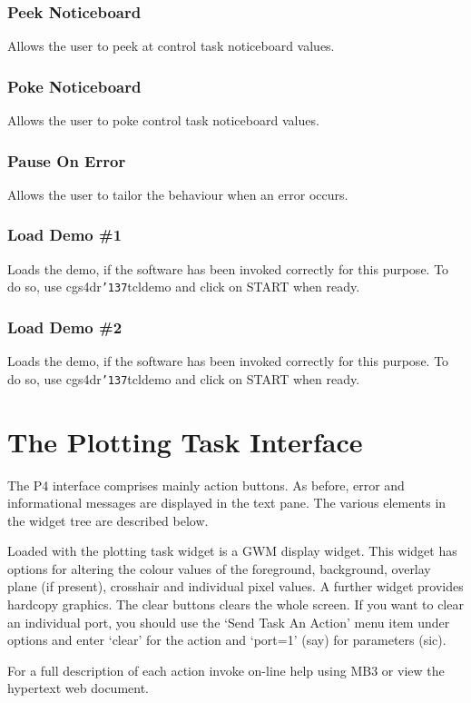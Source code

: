 \documentclass[a4paper]{book}
\renewcommand{\_}{{\tt\char'137}}
\begin{document}
\subsubsection{Peek Noticeboard}
Allows the user to peek at control task noticeboard values.

\subsubsection{Poke Noticeboard}
Allows the user to poke control task noticeboard values.

\subsubsection{Pause On Error}
Allows the user to tailor the behaviour when an error occurs.

\subsubsection{Load Demo \#1}
Loads the demo, if the software has been invoked correctly for this purpose.
To do so, use cgs4dr\_tcldemo and click on START when ready.

\subsubsection{Load Demo \#2}
Loads the demo, if the software has been invoked correctly for this purpose.
To do so, use cgs4dr\_tcldemo and click on START when ready.

\section{The Plotting Task Interface}
The P4 interface comprises mainly action buttons.
As before, error and informational messages are displayed in the text pane.
The various elements in the widget tree are described below. 

Loaded with the plotting task widget is a GWM display widget. This widget
has options for altering the colour values of the foreground, background,
overlay plane (if present), crosshair and individual pixel values. A further
widget provides hardcopy graphics. The {\sc clear} buttons clears the whole screen.
If you want to clear an individual port, you should use the `Send Task An Action'
menu item under options and enter `clear' for the {\sc action} and `port=1' (say)
for {\sc parameters} (sic).

For a full description of each action invoke on-line help using MB3 or view the hypertext web document.
\end{document}
